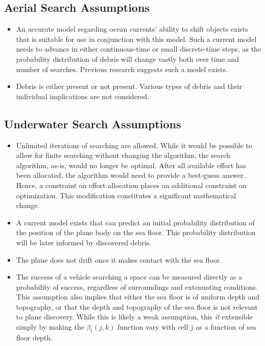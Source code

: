 \subsection{Aerial Search Assumptions}

\begin{itemize}
\item An accurate model regarding ocean currents' ability to shift objects exists that is suitable for use in conjunction with this model. Such a current model needs to advance in either continuous-time or small discrete-time steps, as the probability distribution of debris will change vastly both over time and number of searches. Previous research suggests such a model exists. 
\item Debris is either present or not present. Various types of debris and their individual implications are not considered. 
\end{itemize}

\subsection{Underwater Search Assumptions}

\begin{itemize}
\item Unlimited iterations of searching are allowed. While it would be possible to allow for finite searching without changing the algorithm, the search algorithm, as-is, would no longer be optimal. 
After all available effort has been allocated, the algorithm would need to provide a best-guess answer. Hence, a constraint on effort allocation places an additional constraint on optimization.  This modification constitutes a significant mathematical change.
\item A current model exists that can predict an initial probability distribution of the position of the plane body on the sea floor. This probability distribution will be later informed by discovered debris.
\item The plane does not drift once it makes contact with the sea floor.  
\item The success of a vehicle searching a space can be measured directly as a probability of success, regardless of surroundings and extenuating conditions. This assumption also implies that either the sea floor is of uniform depth and topography, or that the depth and topography of the sea floor is not relevant to plane discovery. While this is likely a weak assumption, this \textit{it} extensible simply by making the $\beta_t(j,k)$ function vary with cell $j$ as a function of sea floor depth. 
\end{itemize}